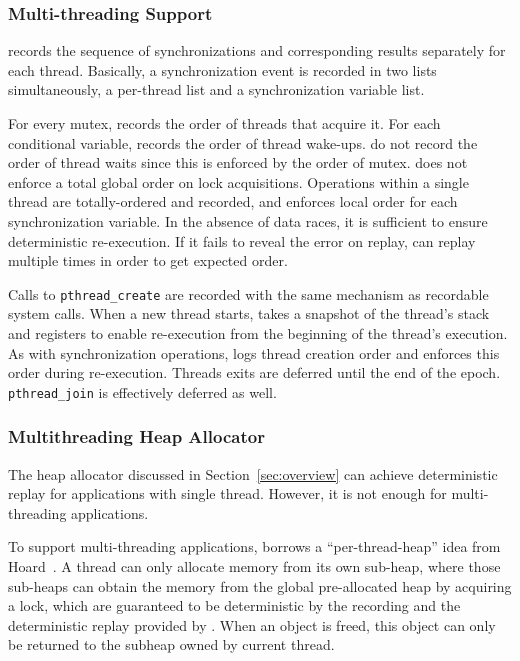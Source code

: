 \subsubsection{Multi-threading Support}
\doubletake{} records the sequence of synchronizations and corresponding results separately for each thread. Basically, a synchronization event is recorded in two lists simultaneously, a per-thread list and a synchronization variable list.

For every mutex, \doubletake{} records the order of threads that acquire it. For each conditional variable, \doubletake{}records the order of thread wake-ups. \doubletake{} do not record the order of thread waits since this is enforced by the order of mutex. \doubletake{} does not enforce a total global order on lock acquisitions. Operations within a single thread are totally-ordered and recorded, and \doubletake{} enforces local order for each synchronization variable. In the absence of data races, it is sufficient to ensure deterministic re-execution. If it fails to reveal the error on replay, \doubletake{} can replay multiple times in order to get expected order.

Calls to \texttt{pthread\_create} are recorded with the same mechanism as recordable system calls. When a new thread starts, \doubletake{} takes a snapshot of the thread's stack and registers to enable re-execution from the beginning of the thread's execution. As with synchronization operations, \doubletake{} logs thread creation order and enforces this order during re-execution.  Threads exits are deferred until the end of the epoch. \texttt{pthread\_join} is effectively deferred as well.

\subsubsection{Multithreading Heap Allocator}
The heap allocator discussed in Section~\ref{sec:overview} can achieve deterministic replay for applications with single thread. However, it is not enough for multi-threading applications. 

To support multi-threading applications, \doubletake{} borrows a ``per-thread-heap'' idea from Hoard~\cite{Hoard}. A thread can only allocate memory from its own sub-heap, where those sub-heaps can obtain the memory from the global pre-allocated heap by acquiring a lock, which are guaranteed to be deterministic by the recording and the deterministic replay provided by \doubletake{}. When an object is freed, this object can only be returned to the subheap owned by current thread. 

